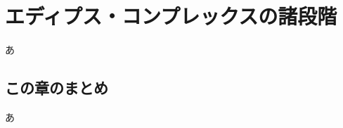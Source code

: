 \section{エディプス・コンプレックスの諸段階}\label{ux7b2cux4e03ux7ae0ux30a8ux30c7ux30a3ux30d7ux30b9ux30b3ux30f3ux30d7ux30ecux30c3ux30afux30b9ux306eux8af8ux6bb5ux968e}

あ

\subsection{この章のまとめ}\label{ux3053ux306eux7ae0ux306eux307eux3068ux3081}

あ
